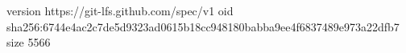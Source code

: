 version https://git-lfs.github.com/spec/v1
oid sha256:6744e4ac2c7de5d9323ad0615b18cc948180babba9ee4f6837489e973a22dfb7
size 5566
